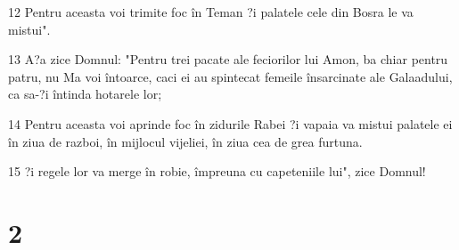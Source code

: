 \par 12 Pentru aceasta voi trimite foc în Teman ?i palatele cele din Bosra le va mistui".
\par 13 A?a zice Domnul: "Pentru trei pacate ale feciorilor lui Amon, ba chiar pentru patru, nu Ma voi întoarce, caci ei au spintecat femeile însarcinate ale Galaadului, ca sa-?i întinda hotarele lor;
\par 14 Pentru aceasta voi aprinde foc în zidurile Rabei ?i vapaia va mistui palatele ei în ziua de razboi, în mijlocul vijeliei, în ziua cea de grea furtuna.
\par 15 ?i regele lor va merge în robie, împreuna cu capeteniile lui", zice Domnul!

\chapter{2}

